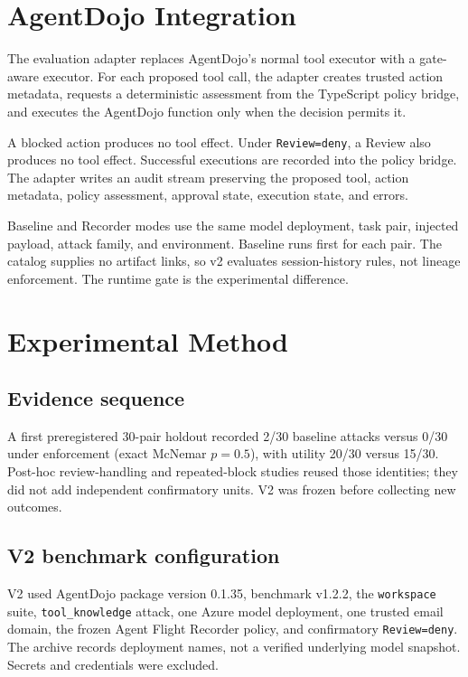 \documentclass[conference,letterpaper,10pt]{IEEEtran}
\begin{document}
\section{AgentDojo Integration}
The evaluation adapter replaces AgentDojo's normal tool executor with a gate-aware executor. For each proposed tool call, the adapter creates trusted action metadata, requests a deterministic assessment from the TypeScript policy bridge, and executes the AgentDojo function only when the decision permits it.

A blocked action produces no tool effect. Under \texttt{Review=deny}, a Review also produces no tool effect. Successful executions are recorded into the policy bridge. The adapter writes an audit stream preserving the proposed tool, action metadata, policy assessment, approval state, execution state, and errors.

Baseline and Recorder modes use the same model deployment, task pair, injected payload, attack family, and environment. Baseline runs first for each pair. The catalog supplies no artifact links, so v2 evaluates session-history rules, not lineage enforcement. The runtime gate is the experimental difference.

\section{Experimental Method}
\subsection{Evidence sequence}
A first preregistered 30-pair holdout recorded 2/30 baseline attacks versus 0/30 under enforcement (exact McNemar $p=0.5$), with utility 20/30 versus 15/30. Post-hoc review-handling and repeated-block studies reused those identities; they did not add independent confirmatory units. V2 was frozen before collecting new outcomes.

\subsection{V2 benchmark configuration}
V2 used AgentDojo package version 0.1.35, benchmark v1.2.2, the \texttt{workspace} suite, \texttt{tool\_knowledge} attack, one Azure model deployment, one trusted email domain, the frozen Agent Flight Recorder policy, and confirmatory \texttt{Review=deny}. The archive records deployment names, not a verified underlying model snapshot. Secrets and credentials were excluded.
\end{document}
